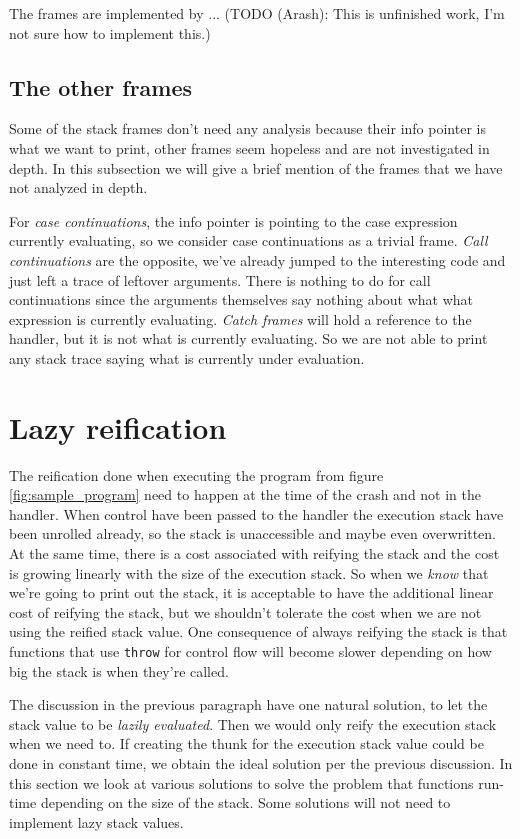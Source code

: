 The frames are implemented by ... (TODO (Arash): This is unfinished
work, I'm not sure how to implement this.)

\subsection{The other frames}

Some of the stack frames don't need any analysis because their info
pointer is what we want to print, other frames seem hopeless and are not
investigated in depth. In this subsection we will give a brief mention
of the frames that we have not analyzed in depth.

For \emph{case continuations}, the info pointer is pointing to the case
expression currently evaluating, so we consider case continuations as a
trivial frame. \emph{Call continuations} are the opposite, we've already
jumped to the interesting code and just left a trace of leftover arguments.
There is nothing to do for call continuations since the arguments themselves
say nothing about what what expression is currently evaluating.
\emph{Catch frames} will hold a reference to the handler, but it is
not what is currently evaluating. So we are not able to print any stack trace
saying what is currently under evaluation.

\section{Lazy reification} \label{sec:lazy_reification}

The reification done when executing the program from figure
\ref{fig:sample_program} need to happen at the time of the crash and
not in the handler. When control have been passed to the handler the
execution stack have been unrolled already, so the stack is unaccessible
and maybe even overwritten. At the same time, there is a cost associated
with reifying the stack and the cost is growing linearly with the size
of the execution stack. So when we \emph{know} that we're going to print
out the stack, it is acceptable to have the additional linear cost of
reifying the stack, but we shouldn't tolerate the cost when we are not
using the reified stack value. One consequence of always reifying the
stack is that functions that use \texttt{throw} for control flow will
become slower depending on how big the stack is when they're called.

The discussion in the previous paragraph have one natural solution, to
let the stack value to be \emph{lazily evaluated}. Then we would only
reify the execution stack when we need to. If creating the thunk for
the execution stack value could be done in constant time, we obtain the
ideal solution per the previous discussion. In this section we look at
various solutions to solve the problem that functions run-time depending
on the size of the stack. Some solutions will not need to implement
lazy stack values.

